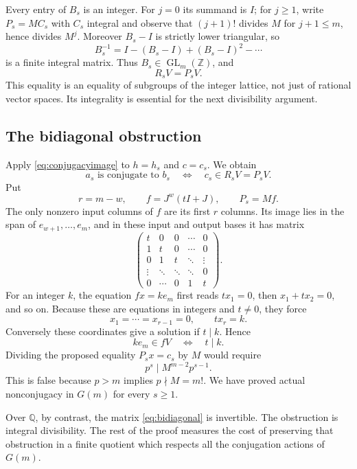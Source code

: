 \documentclass[11pt]{article}
\numberwithin{equation}{section}
\theoremstyle{definition}
\theoremstyle{remark}
\newcommand{\Z}{\mathbb Z}
\newcommand{\Q}{\mathbb Q}
\newcommand{\GL}{\operatorname{GL}}
\begin{document}
Every entry of $B_s$ is an integer. For $j=0$ its summand is $I$; for $j\ge1$, write $P_s=MC_s$ with $C_s$ integral and observe that $(j+1)!$ divides $M$ for $j+1\le m$, hence divides $M^j$. Moreover $B_s-I$ is strictly lower triangular, so
\[
B_s^{-1}=I-(B_s-I)+(B_s-I)^2-\cdots
\]
is a finite integral matrix. Thus $B_s\in\GL_m(\Z)$, and
\begin{equation}\label{eq:equalimages}
R_sV=P_sV.
\end{equation}
This equality is an equality of subgroups of the integer lattice, not just of rational vector spaces. Its integrality is essential for the next divisibility argument.

\subsection{The bidiagonal obstruction}
Apply \eqref{eq:conjugacyimage} to $h=h_s$ and $c=c_s$. We obtain
\[
a_s\text{ is conjugate to }b_s
\quad\Longleftrightarrow\quad c_s\in R_sV=P_sV.
\]
Put
\begin{equation}\label{eq:f}
r=m-w,\qquad f=J^w(tI+J),\qquad P_s=Mf.
\end{equation}
The only nonzero input columns of $f$ are its first $r$ columns. Its image lies in the span of $e_{w+1},\ldots,e_m$, and in these input and output bases it has matrix
\begin{equation}\label{eq:bidiagonal}
\begin{pmatrix}
t&0&0&\cdots&0\\
1&t&0&\cdots&0\\
0&1&t&\ddots&\vdots\\
\vdots&\ddots&\ddots&\ddots&0\\
0&\cdots&0&1&t
\end{pmatrix}.
\end{equation}
For an integer $k$, the equation $fx=ke_m$ first reads $tx_1=0$, then $x_1+tx_2=0$, and so on. Because these are equations in integers and $t\ne0$, they force
\[
x_1=\cdots=x_{r-1}=0,\qquad tx_r=k.
\]
Conversely these coordinates give a solution if $t\mid k$. Hence
\begin{equation}\label{eq:integerimage}
ke_m\in fV\quad\Longleftrightarrow\quad t\mid k.
\end{equation}
Dividing the proposed equality $P_sx=c_s$ by $M$ would require
\[
p^s\mid M^{m-2}p^{s-1}.
\]
This is false because $p>m$ implies $p\nmid M=m!$. We have proved actual nonconjugacy in $G(m)$ for every $s\ge1$.

Over $\Q$, by contrast, the matrix \eqref{eq:bidiagonal} is invertible. The obstruction is integral divisibility. The rest of the proof measures the cost of preserving that obstruction in a finite quotient which respects all the conjugation actions of $G(m)$.
\end{document}
